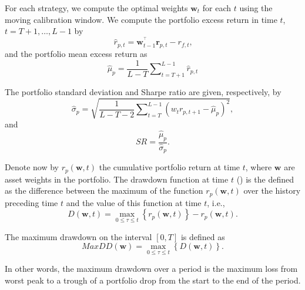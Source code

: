 \documentclass[a4paper,10pt]{article}
\begin{document}
For each strategy, we compute the optimal weights $\mathbf{w}_{t}$ for each $%
t$ using the moving calibration window. We compute the portfolio excess
return in time $t$, $t=T+1,\ldots,L-1$ by
\begin{equation}
\widehat{r}_{p,t}=\mathbf{w}_{t-1}^{^{\top }}\mathbf{r}_{p,t}-r_{f,t}\text{,}
\end{equation}
and the portfolio mean excess return as
\begin{equation}
\widehat{\mu }_{p}=\frac{1}{L-T}\sum\nolimits_{t=T+1}^{L-1}\widehat{r}_{p,t}
\end{equation}

\bigskip The portfolio standard deviation and Sharpe ratio are given,
respectively, by
\begin{equation}
\widehat{\sigma }_{p}=\sqrt{\frac{1}{L-T-2}\sum\nolimits_{t=T}^{L-1}\left(w_{t}r_{p,t+1}-\widehat{\mu }_{p}\right)^{2}},
\end{equation}
and
\begin{equation}
SR=\frac{\widehat{\mu }_{p}}{\widehat{\sigma }_{p}}.
\end{equation}

Denote now by $r_{p}\left( \mathbf{w,}t\right) $ the cumulative portfolio return at time $t$, where $\mathbf{w}$ are asset weights in the portfolio. The drawdown function at time $t$ (\citet*{unger2014}) is the defined as the difference between the maximum of the function $r_{p}\left( \mathbf{w,} t\right) $ over the history preceding time $t$ and the value of this
function at time $t$, i.e.,
\begin{equation}
D\left( \mathbf{w,}t\right) =\underset{0\leq \tau \leq t}{\max }\left\{
r_{p}\left( \mathbf{w,}t\right) \right\} -r_{p}\left( \mathbf{w,}t\right) .
\end{equation}%

The maximum drawdown on the interval $[0,T]$ is defined as
\begin{equation}
MaxDD\left( \mathbf{w}\right) =\underset{0\leq \tau \leq t}{\max }\left\{
D\left( \mathbf{w,}t\right) \right\} .
\end{equation}

In other words, the maximum drawdown over a period is the maximum loss from worst peak to a trough of a portfolio drop from the start to the end of the period.
\end{document}
